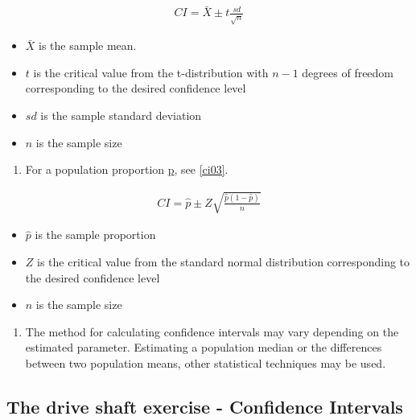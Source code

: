 \documentclass[
  a4paper,
]{scrbook}
\providecommand{\tightlist}{%
  \setlength{\itemsep}{0pt}\setlength{\parskip}{0pt}}\usepackage{longtable,booktabs,array}
\begin{document}
\begin{align}
CI = \bar{X} \pm t \frac{sd}{\sqrt{n}} \label{ci02}
\end{align}

\begin{itemize}
\item
  \(\bar{X}\) is the sample mean.
\item
  \(t\) is the critical value from the t-distribution with \(n-1\)
  degrees of freedom corresponding to the desired confidence level
\item
  \(sd\) is the sample standard deviation
\item
  \(n\) is the sample size
\end{itemize}

\begin{enumerate}
\def\labelenumi{\arabic{enumi}.}
\setcounter{enumi}{2}
\tightlist
\item
  For a population proportion \hyperref[popprop-gloss]{p}, see
  \eqref{ci03}.
\end{enumerate}

\begin{align}
CI = \hat{p} \pm Z \sqrt{\frac{\hat{p}(1-\hat{p})}{n}} \label{ci03}
\end{align}

\begin{itemize}
\item
  \(\hat{p}\) is the sample proportion
\item
  \(Z\) is the critical value from the standard normal distribution
  corresponding to the desired confidence level
\item
  \(n\) is the sample size
\end{itemize}

\begin{enumerate}
\def\labelenumi{\arabic{enumi}.}
\setcounter{enumi}{3}
\tightlist
\item
  The method for calculating confidence intervals may vary depending on
  the estimated parameter. Estimating a population median or the
  differences between two population means, other statistical techniques
  may be used.
\end{enumerate}

\subsection{The drive shaft exercise - Confidence
Intervals}\label{the-drive-shaft-exercise---confidence-intervals}
\end{document}
